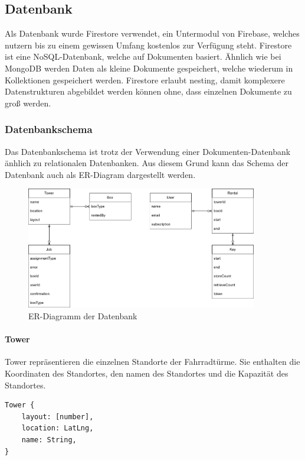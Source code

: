 \subsection{Datenbank}

Als Datenbank wurde Firestore verwendet, ein Untermodul von Firebase, welches nutzern bis zu einem gewissen Umfang kostenlos zur Verfügung steht. Firestore ist eine NoSQL-Datenbank, welche auf Dokumenten basiert. Ähnlich wie bei MongoDB werden Daten als kleine Dokumente gespeichert, welche wiederum in Kollektionen gespeichert werden. Firestore erlaubt nesting, damit komplexere Datenstrukturen abgebildet werden können ohne, dass einzelnen Dokumente zu groß werden.



\subsubsection{Datenbankschema}
Das Datenbankschema ist trotz der Verwendung einer Dokumenten-Datenbank änhlich zu relationalen Datenbanken. Aus diesem Grund kann das Schema der Datenbank auch als ER-Diagram dargestellt werden.

\begin{figure}[ht]
    \centering
    \includegraphics[width=0.9\textwidth]{images/datenbankstruktur.png}
    \caption{ER-Diagramm der Datenbank}
    \label{fig:er_diagramm}
\end{figure}

\paragraph{Tower}
Tower repräsentieren die einzelnen Standorte der Fahrradtürme. Sie enthalten die Koordinaten des Standortes, den namen des Standortes und die Kapazität des Standortes.

\begin{verbatim}
Tower {
    layout: [number],
    location: LatLng,
    name: String,
}
\end{verbatim}

